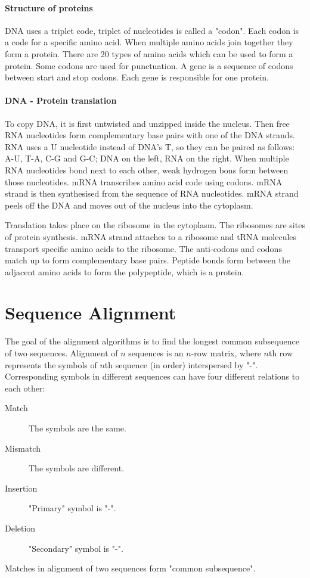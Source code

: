 \documentclass[a5paper]{report}
\begin{document}
\paragraph{Structure of proteins}
DNA uses a triplet code, triplet of nucleotides is called a "codon".
Each codon is a code for a specific amino acid.
When multiple amino acids join together they form a protein.
There are 20 types of amino acids which can be used to form a protein.
Some codons are used for punctuation.
A gene is a sequence of codons between start and stop codons.
Each gene is responsible for one protein.
\paragraph{DNA - Protein translation}
To copy DNA, it is first untwisted and unzipped inside the nucleus.
Then free RNA nucleotides form complementary base pairs with one of the DNA strands.
RNA uses a U nucleotide instead of DNA's T, so they can be paired as follows: A-U, T-A, C-G and G-C; DNA on the left, RNA on the right.
When multiple RNA nucleotides bond next to each other, weak hydrogen bons form between those nucleotides.
mRNA transcribes amino acid code using codons.
mRNA strand is then synthesised from the sequence of RNA nucleotides.
mRNA strand peels off the DNA and moves out of the nucleus into the cytoplasm.

Translation takes place on the ribosome in the cytoplasm.
The ribosomes are sites of protein synthesis.
mRNA strand attaches to a ribosome and tRNA molecules transport specific amino acids to the ribosome.
The anti-codons and codons match up to form complementary base pairs.
Peptide bonds form between the adjacent amino acids to form the polypeptide, which is a protein.

\section{Sequence Alignment}
The goal of the alignment algorithms is to find the longest common subsequence of two sequences.
Alignment of $n$ sequences is an $n\text{-row}$ matrix, where $n$th row represents the symbols of $n$th sequence (in order) interspersed by "-".
Corresponding symbols in different sequences can have four different relations to each other:
\begin{description}
\item[Match] The symbols are the same.
\item[Mismatch] The symbols are different.
\item[Insertion] "Primary" symbol is "-".
\item[Deletion] "Secondary" symbol is "-".
\end{description}
Matches in alignment of two sequences form "common subsequence".
\end{document}
